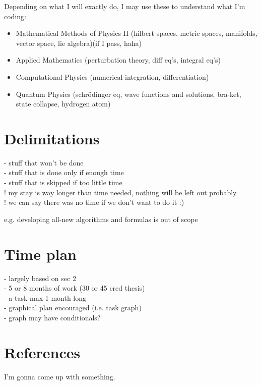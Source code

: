 \documentclass[12pt]{article}
\begin{document}
	Depending on what I will exactly do, I may use these to understand what I'm coding:
	\begin{itemize}
		\item Mathematical Methods of Physics II (hilbert spaces, metric spaces, manifolds, vector space, lie algebra)(if I pass, haha)
		\item Applied Mathematics (perturbation theory, diff eq's, integral eq's)
		\item Computational Physics (numerical integration, differentiation)
		\item Quantum Physics (schrödinger eq, wave functions and solutions, bra-ket, state collapse, hydrogen atom)
	\end{itemize}
	
	
	
	\section{Delimitations}

	\color{red}
	- stuff that won't be done\\
	- stuff that is done only if enough time\\
	- stuff that is skipped if too little time \\
	! my stay is way longer than time needed, nothing will be left out probably\\
	! we can say there was no time if we don't want to do it :) \\
	\color{black}
	
	e.g. developing all-new algorithms and formulas is out of scope



	\section{Time plan}
		
	\color{red}
	- largely based on sec 2 \\
	- 5 or 8 months of work (30 or 45 cred thesis) \\
	- a task max 1 month long \\
	- graphical plan encouraged (i.e. task graph) \\
	- graph may have conditionals?
	\color{black}
	
	
	
	\section{References}
	
	\color{red}
	I'm gonna come up with something.
	\color{black}
	
\end{document}
